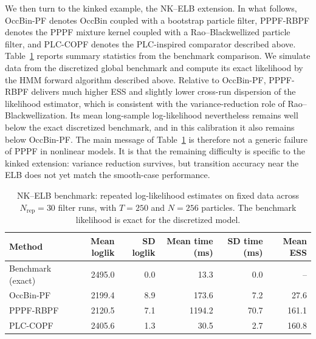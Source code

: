 \documentclass[11pt]{article}
\theoremstyle{remark}
\begin{document}
We then turn to the kinked example, the NK--ELB extension.
In what follows, OccBin-PF denotes OccBin coupled with a bootstrap particle filter, PPPF-RBPF denotes the PPPF mixture kernel coupled with a Rao--Blackwellized particle filter, and PLC-COPF denotes the PLC-inspired comparator described above.
Table~\ref{tab:nk_summary} reports summary statistics from the benchmark comparison.
We simulate data from the discretized global benchmark and compute its exact likelihood by the HMM forward algorithm described above.
Relative to OccBin-PF, PPPF-RBPF delivers much higher ESS and slightly lower cross-run dispersion of the likelihood estimator, which is consistent with the variance-reduction role of Rao--Blackwellization.
Its mean long-sample log-likelihood nevertheless remains well below the exact discretized benchmark, and in this calibration it also remains below OccBin-PF.
The main message of Table~\ref{tab:nk_summary} is therefore not a generic failure of PPPF in nonlinear models.
It is that the remaining difficulty is specific to the kinked extension: variance reduction survives, but transition accuracy near the ELB does not yet match the smooth-case performance.

\begin{table}[t]
\centering
\scriptsize
\setlength{\tabcolsep}{3pt}
\begin{tabular}{lrrrrr}
\toprule
Method & Mean loglik & SD loglik & Mean time (ms) & SD time (ms) & Mean ESS \\
\midrule
Benchmark (exact) & 2495.0 & 0.0 & 13.3 & 0.0 & -- \\
OccBin-PF & 2199.4 & 8.9 & 173.6 & 7.2 & 27.6 \\
PPPF-RBPF & 2120.5 & 7.1 & 1194.2 & 70.7 & 161.1 \\
PLC-COPF & 2405.6 & 1.3 & 30.5 & 2.7 & 160.8 \\
\bottomrule
\end{tabular}
\caption{NK--ELB benchmark: repeated log-likelihood estimates on fixed data across $N_{\mathrm{rep}}=30$ filter runs, with $T=250$ and $N=256$ particles. The benchmark likelihood is exact for the discretized model.}
\label{tab:nk_summary}
\end{table}
\end{document}
